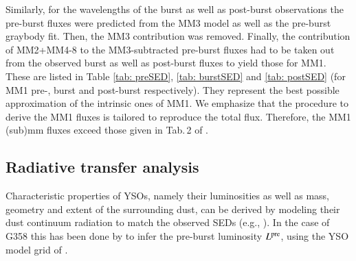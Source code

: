 Similarly, for the wavelengths of the burst as well as post-burst observations the pre-burst fluxes were predicted from the MM3 model as well as the pre-burst graybody fit. Then, the MM3 contribution was removed. Finally, the contribution of MM2+MM4-8 to the MM3-subtracted pre-burst fluxes had to be taken out from the observed burst as well as post-burst fluxes to yield those for MM1.
These are listed in Table \ref{tab: preSED}, \ref{tab: burstSED} and \ref{tab: postSED} (for MM1 pre-, burst and post-burst respectively).
They
represent the best possible approximation of the intrinsic ones of MM1.
We emphasize that the procedure to derive the MM1 fluxes is tailored to reproduce the total flux. Therefore, the MM1 (sub)mm fluxes exceed those given in Tab.\,2 of \cite{2019ApJ...881L..39B}.



\subsection{Radiative transfer analysis}\label{rta}
Characteristic properties of YSOs, namely their luminosities as well as mass, geometry and extent of the surrounding dust, can be derived by modeling their dust continuum radiation to match the observed SEDs (e.g., \citealp{2012ascl.soft04005W, 2013ApJS..207...30W}). In the case of G358 this has been done by \citet{2019ApJ...881L..39B} to infer the  pre-burst luminosity
$L^{\rm pre}$,
using the YSO model grid of \citet{2017A&A...600A..11R}. 

